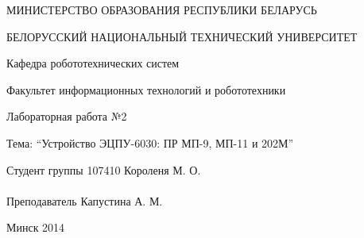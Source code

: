 \begin{titlepage} %

\thispagestyle{empty} %

\begin{center}
МИНИСТЕРСТВО ОБРАЗОВАНИЯ РЕСПУБЛИКИ БЕЛАРУСЬ

БЕЛОРУССКИЙ НАЦИОНАЛЬНЫЙ ТЕХНИЧЕСКИЙ УНИВЕРСИТЕТ

Кафедра робототехнических систем

Факультет информационных технологий и робототехники
\end{center}

\vfill

\begin{center}
Лабораторная работа №2

Тема: ``Устройство ЭЦПУ-6030: ПР МП-9, МП-11 и 202М''
\end{center}

\vfill

\noindent
Студент группы 107410 \hfill Короленя М. О.
\\
\\
\noindent
Преподаватель \hfill Капустина А. М.

\vfill

\centerline{Минск 2014}

\clearpage %

\end{titlepage}

\setcounter{page}{2}
